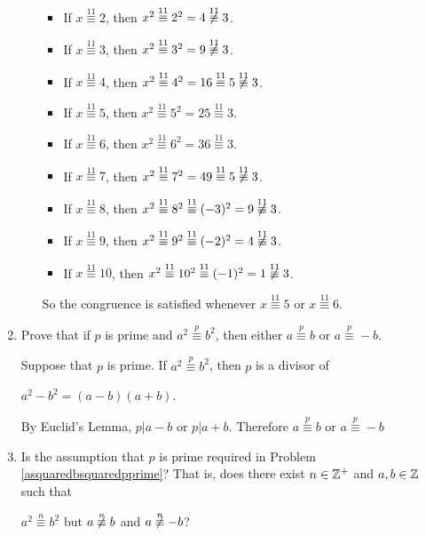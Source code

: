 \documentclass[11pt,fleqn,dvipsnames,usenames]{article}
\begin{document}
\begin{enumerate}
\begin{enumerate}[(a)]
\begin{itemize}[\ ]
\item If $x\overset{11}{\equiv}2$, then $x^2\overset{11}{\equiv}2^2 = 4\not\overset{11}{\equiv}3$.
\item If $x\overset{11}{\equiv}3$, then $x^2\overset{11}{\equiv}3^2 = 9\not\overset{11}{\equiv}3$.
\item If $x\overset{11}{\equiv}4$, then $x^2\overset{11}{\equiv}4^2 = 16\overset{11}{\equiv}5\not\overset{11}{\equiv}3$.
\item If $x\overset{11}{\equiv}5$, then $x^2\overset{11}{\equiv}5^2 = 25\overset{11}{\equiv}3$.
\item If $x\overset{11}{\equiv}6$, then $x^2\overset{11}{\equiv}6^2 = 36\overset{11}{\equiv}3$.
\item If $x\overset{11}{\equiv}7$, then $x^2\overset{11}{\equiv}7^2 = 49\overset{11}{\equiv}5\not\overset{11}{\equiv}3$.
\item If $x\overset{11}{\equiv}8$, then $x^2\overset{11}{\equiv}8^2\overset{11}{\equiv}(-3)^2 = 9\not\overset{11}{\equiv}3$.
\item If $x\overset{11}{\equiv}9$, then $x^2\overset{11}{\equiv}9^2\overset{11}{\equiv}(-2)^2 = 4\not\overset{11}{\equiv}3$.
\item If $x\overset{11}{\equiv}10$, then $x^2\overset{11}{\equiv}10^2 \overset{11}{\equiv}(-1)^2 = 1\not\overset{11}{\equiv}3$.
\end{itemize}
So the congruence is satisfied whenever $x\overset{11}{\equiv}5$ or $x\overset{11}{\equiv}6$.
\end{enumerate}

\item \label{asquaredbsquaredpprime} Prove that if $p$ is prime and $a^2\overset{p}{\equiv}b^2$, then either $a\overset{p}{\equiv}b$ or $a\overset{p}{\equiv}-b$.
\vsmsp

\solution Suppose that $p$ is prime.  If $a^2\overset{p}{\equiv}b^2$, then $p$ is a divisor of
\begin{center}
$a^2 - b^2 = (a-b)(a+b)$.
\end{center}
By Euclid's Lemma, $p|a-b$ or $p|a+b$.  Therefore $a\overset{p}{\equiv}b$ or $a\overset{p}{\equiv}-b$

\item Is the assumption that $p$ is prime required in Problem \ref{asquaredbsquaredpprime}?  That is, does there exist $n\in\mathbb{Z}^{+}$ and $a,b\in\mathbb{Z}$ such that
\begin{center}
$a^2\overset{n}{\equiv}b^2$ but $a\not\overset{n}{\equiv}b$ and $a\not\overset{n}{\equiv}-b$?
\end{center}
\vsmsp


\end{enumerate}
\end{document}
